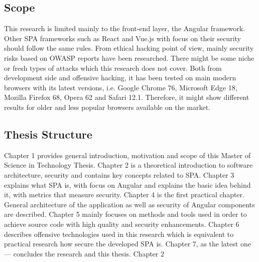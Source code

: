 \documentclass{article} %
\begin{document}
\subsection{Scope}
This research is limited mainly to the front-end layer, the Angular framework. Other SPA frameworks such as React and Vue.js with focus on their security should follow the same rules. From ethical hacking point of view, mainly security risks based on OWASP reports have been researched. There might be some niche or fresh types of attacks which this research does not cover. Both from development side and offensive hacking, it has been tested on main modern browsers with its latest versions, i.e. Google Chrome 76, Microsoft Edge 18, Mozilla Firefox 68, Opera 62 and Safari 12.1. Therefore, it might show different results for older and less popular browsers available on the market.
\subsection{Thesis Structure}
Chapter 1 provides general introduction, motivation and scope of this Master of Science in Technology Thesis. Chapter 2 is a theoretical introduction to software architecture, security and contains key concepts related to SPA. Chapter 3 explains what SPA is, with focus on Angular and explains the basic idea behind it, with metrics that measure security. Chapter 4 is the first practical chapter. General architecture of the application as well as security of Angular components are described. Chapter 5 mainly focuses on methods and tools used in order to achieve source code with high quality and security enhancements. Chapter 6 describes offensive technologies used in this research which is equivalent to practical research how secure the developed SPA is. Chapter 7, as the latest one --- concludes the research and this thesis.
\newpage
\huge Chapter 2
\end{document}
